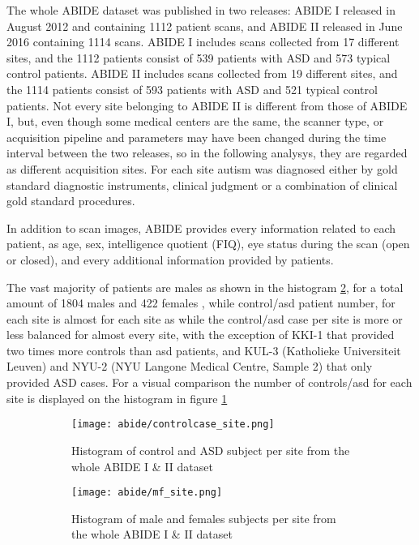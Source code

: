 \documentclass[11pt]{report}
\begin{document}
The whole ABIDE dataset was published in two releases: ABIDE I released in August 2012 and containing 1112 patient scans, and ABIDE II released in June 2016 containing 1114 scans.
ABIDE I includes scans collected from 17 different sites, and the 1112 patients consist of 539 patients with ASD and 573 typical control patients.
ABIDE II includes scans collected from 19 different sites, and the 1114 patients consist of 593 patients with ASD and 521 typical control patients.
Not every site belonging to ABIDE II is different from those of ABIDE I, but, even though some medical centers are the same, the scanner type, or acquisition pipeline and parameters may have been changed during the time interval between the two releases, so in the following analysys, they are regarded as different acquisition sites.
For each site autism was diagnosed either by gold standard diagnostic instruments, clinical judgment or a combination of clinical gold standard procedures.

In addition to scan images, ABIDE provides every information related to each patient, as age, sex, intelligence quotient (FIQ), eye status during the scan (open or closed), and every additional information provided by patients.

The vast majority of patients are males as shown in the histogram \ref{fig:mf_site}, for a total amount of 1804 males and 422 females , while control/asd patient number, for each site is almost  for each site as
while the control/asd case per site is more or less balanced for almost every site, with the exception of KKI-1 that provided two times more controls than asd patients, and KUL-3 (Katholieke Universiteit Leuven) and NYU-2 (NYU Langone Medical Centre, Sample 2) that only provided ASD cases. For a visual comparison the number of controls/asd for each site is displayed on the histogram in figure \ref{fig:controlcase_site}

\begin{figure}[h]
\centering
\begin{subfigure}{0.9\textwidth}
\texttt{[image: abide/controlcase\_site.png]}
\caption{Histogram of control and ASD subject per site from the whole ABIDE I \& II dataset}
\label{fig:controlcase_site}
\end{subfigure}
\begin{subfigure}{0.9\textwidth}
\texttt{[image: abide/mf\_site.png]}
\caption{Histogram of male and females subjects per site from the whole ABIDE I \& II dataset}
\label{fig:mf_site}
\end{subfigure}
\caption{}
\label{}
\end{figure}
\end{document}

